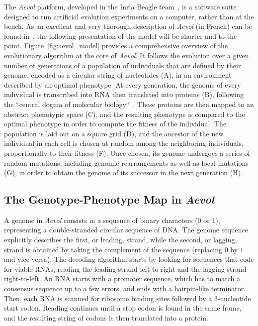 The \emph{Aevol} platform, developed in the Inria Beagle team~\citep{rutten2019}, is a software suite designed to run artificial evolution experiments on a computer, rather than at the bench.
As an excellent and very thorough description of \emph{Aevol} (in French) can be found in~\cite{liard2020b}, the following presentation of the model will be shorter and to the point.
Figure~\ref{fig:aevol_model} provides a comprehensive overview of the evolutionary algorithm at the core of \emph{Aevol}.
It follows the evolution over a given number of generations of a population of individuals that are defined by their genome, encoded as a circular string of nucleotides (A), in an environment described by an optimal phenotype.
At every generation, the genome of every individual is transcribed into RNA then translated into proteins (B), following the ``central dogma of molecular biology``~\citep{crick1958}.
These proteins are then mapped to an abstract phenotypic space (C), and the resulting phenotype is compared to the optimal phenotype in order to compute the fitness of the individual.
The population is laid out on a square grid (D), and the ancestor of the new individual in each cell is chosen at random among the neighboring individuals, proportionally to their fitness (F).
Once chosen, its genome undergoes a series of random mutations, including genomic rearrangements as well as local mutations (G), in order to obtain the genome of its successor in the next generation (H).

\subsection{The Genotype-Phenotype Map in \emph{Aevol}}

A genome in \emph{Aevol} consists in a sequence of binary characters ($0$ or $1$), representing a double-stranded circular sequence of DNA.
The genome sequence explicitly describes the first, or leading, strand, while the second, or lagging, strand is obtained by taking the complement of the sequence (replacing $0$ by $1$ and vice-versa).
The decoding algorithm starts by looking for sequences that code for viable RNAs, reading the leading strand left-to-right and the lagging strand right-to-left.
An RNA starts with a promoter sequence, which has to match a consensus sequence up to a few errors, and ends with a hairpin-like terminator.
Then, each RNA is scanned for ribosome binding sites followed by a 3-nucleotide start codon.
Reading continues until a stop codon is found in the same frame, and the resulting string of codons is then translated into a protein.

